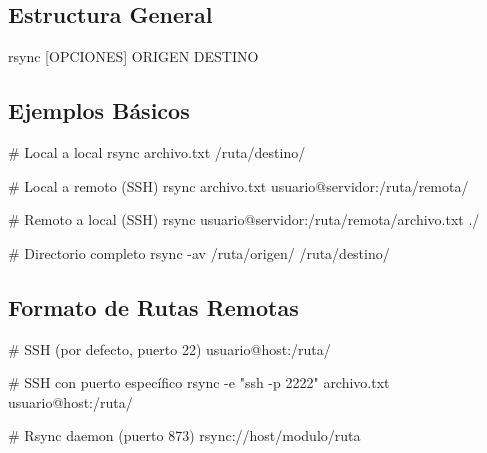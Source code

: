 \documentclass[
  doc,
  floatsintext,
  longtable,
  a4paper,
  nolmodern,
  notxfonts,
  notimes,
  12pt,
  colorlinks=true,linkcolor=blue,citecolor=blue,urlcolor=blue]{apa7}
\newenvironment{Shaded}{\begin{snugshade}}{\end{snugshade}}
\newcommand{\AttributeTok}[1]{\textcolor[rgb]{0.40,0.45,0.13}{#1}}
\newcommand{\CommentTok}[1]{\textcolor[rgb]{0.37,0.37,0.37}{#1}}
\newcommand{\ExtensionTok}[1]{\textcolor[rgb]{0.00,0.23,0.31}{#1}}
\newcommand{\FunctionTok}[1]{\textcolor[rgb]{0.28,0.35,0.67}{#1}}
\newcommand{\NormalTok}[1]{\textcolor[rgb]{0.00,0.23,0.31}{#1}}
\newcommand{\PreprocessorTok}[1]{\textcolor[rgb]{0.68,0.00,0.00}{#1}}
\newcommand{\SpecialStringTok}[1]{\textcolor[rgb]{0.13,0.47,0.30}{#1}}
\newcommand{\StringTok}[1]{\textcolor[rgb]{0.13,0.47,0.30}{#1}}
\begin{document}
\subsection{Estructura General}\label{estructura-general}

\begin{Shaded}
\begin{Highlighting}[]
\FunctionTok{rsync} \PreprocessorTok{[}\SpecialStringTok{OPCIONES}\PreprocessorTok{]}\NormalTok{ ORIGEN DESTINO}
\end{Highlighting}
\end{Shaded}

\subsection{Ejemplos Básicos}\label{ejemplos-buxe1sicos}

\begin{Shaded}
\begin{Highlighting}[]
\CommentTok{\# Local a local}
\FunctionTok{rsync}\NormalTok{ archivo.txt /ruta/destino/}

\CommentTok{\# Local a remoto (SSH)}
\FunctionTok{rsync}\NormalTok{ archivo.txt usuario@servidor:/ruta/remota/}

\CommentTok{\# Remoto a local (SSH)}
\FunctionTok{rsync}\NormalTok{ usuario@servidor:/ruta/remota/archivo.txt ./}

\CommentTok{\# Directorio completo}
\FunctionTok{rsync} \AttributeTok{{-}av}\NormalTok{ /ruta/origen/ /ruta/destino/}
\end{Highlighting}
\end{Shaded}

\subsection{Formato de Rutas Remotas}\label{formato-de-rutas-remotas}

\begin{Shaded}
\begin{Highlighting}[]
\CommentTok{\# SSH (por defecto, puerto 22)}
\ExtensionTok{usuario@host:/ruta/}

\CommentTok{\# SSH con puerto específico}
\FunctionTok{rsync} \AttributeTok{{-}e} \StringTok{"ssh {-}p 2222"}\NormalTok{ archivo.txt usuario@host:/ruta/}

\CommentTok{\# Rsync daemon (puerto 873)}
\ExtensionTok{rsync://host/modulo/ruta}
\end{Highlighting}
\end{Shaded}
\end{document}
